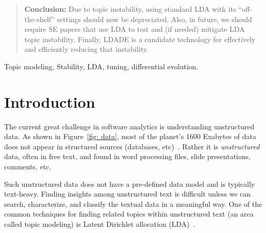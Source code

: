 \documentclass[twocolumn,5p,sort&compress]{elsarticle}
\theoremstyle{break}
\begin{document}
\begin{frontmatter}
\begin{abstract}
\noindent
\textbf{Conclusion:}
  Due to topic instability,
  using standard LDA with its ``off-the-shelf'' settings should now be depreciated.
  Also, in future,
we should require
SE
papers that use
LDA
to
test and (if needed) mitigate LDA topic instability.
  Finally, LDADE is a candidate technology for effectively and efficiently reducing that instability.  
\end{abstract}

\begin{keyword}
Topic modeling, Stability, LDA, tuning, differential evolution.
\end{keyword}

\end{frontmatter}



\section{Introduction}
\label{sect:intro} 




The current great challenge in software analytics
is understanding unstructured data. As shown in Figure~\ref{fig:
data}, most of the planet's 1600 Exabytes of data does not appear
in structured sources (databases, etc)~\cite{nadkarni2014structured}.
Rather it is {\em unstructured} data, often in free text, and found
in word processing files, slide presentations, comments, etc.

Such unstructured data does not have a pre-defined data model and
is typically text-heavy. Finding insights among unstructured text
is  difficult unless we can search, characterize, and classify the
textual data in a meaningful way. One of the common techniques for
finding related topics within unstructured text (an area called
topic modeling) is Latent Dirichlet allocation (LDA)~\cite{blei2003latent}.
\end{document}
